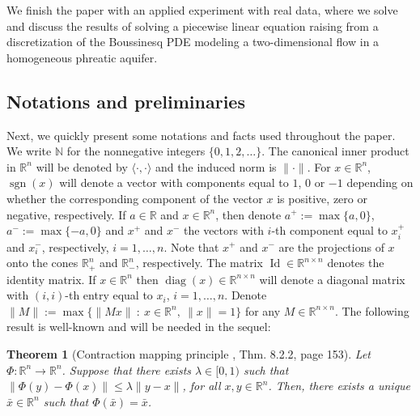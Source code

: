 \documentclass[11pt]{article}
\newtheorem{theorem}{Theorem}[section]
\newtheorem{lemma}{Lemma}[section]
\DeclareMathOperator{\diag}{diag}
\DeclareMathOperator{\sgn}{sgn}
\DeclareMathOperator{\Id}{Id}
\newcommand{\lng}{\langle}
\newcommand{\rng}{\rangle}
\newcommand{\R}{\mathbb R}
\newcommand{\NN}{\mathbb{N}}
\begin{document}
We finish the paper with an applied experiment with real data, where we solve and discuss the results of solving a piecewise linear equation raising from a discretization of the Boussinesq PDE \cite{Brugnano2008} modeling a two-dimensional flow in a homogeneous phreatic aquifer.



  
 
\subsection{Notations and preliminaries} \label{sec:int.1}
Next, we quickly present some notations and  facts used throughout the paper.
We write $\NN$ for the nonnegative integers $\{0,1,2,\ldots\}$.
The canonical inner  product in $\R^n$ will be denoted by
$\lng\cdot,\cdot\rng$  and the induced norm is $\|\cdot\|$.  %
  For $x\in \R^n$, $\sgn(x)$ will denote a vector with components equal to $1$, $0$ or $-1$ depending on whether the corresponding component of the
vector $x$ is positive, zero or negative, respectively.    If $a\in\R$ and $x\in\R^n$, then denote $a^+:=\max\{a,0\}$, $a^-:=\max\{-a,0\}$ and $x^+$ and  $x^-$  the vectors with  $i$-th component equal to $x_i^+$ and  $x_ i^-$, respectively, $i=1,\dots,n$. Note that $x^+$ and $x^-$ are the projections of $x$ onto the cones $\R^n_+$ and $\R^n_-$, respectively. The matrix ${\Id} \in \R^{n \times n}$ denotes the  identity matrix.  If $x\in \R^n$ then $\diag (x)\in \R^{n \times n}$ will denote a  diagonal matrix with $(i,i)$-th entry equal to $x_i$, $i=1,\dots,n$. Denote $\|M\|:=\max \{\|Mx\|~:~  x\in \R^{n}, ~\|x\|=1\}$ for any  $M \in \R^{n\times n}$.
The following result is well-known and will be needed in the sequel:
\begin{theorem}[Contraction mapping principle \cite{Ortega:1987}, Thm. 8.2.2,  page 153] \label{fixedpoint}
 Let  $\Phi : \R^{n} \to   \R^{n}$.  Suppose that there exists $\lambda \in  [0,1)$ such that  $\|\Phi(y)-\Phi(x)\| \le \lambda \|y-x\|$, for all $ x, y \in  \R^{n}$. Then, there exists a unique $\bar x\in  \R^{n}$  such that $\Phi(\bar x) = \bar x$.
\end{theorem}
\end{document}
